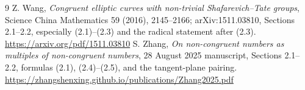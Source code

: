 \documentclass[11pt,a4paper]{article}
\begin{document}
\begin{thebibliography}{9}
 Z. Wang, \emph{Congruent elliptic curves with non-trivial Shafarevich--Tate groups}, Science China Mathematics 59 (2016), 2145--2166; arXiv:1511.03810, Sections 2.1--2.2, especially (2.1)--(2.3) and the radical statement after (2.3). \url{https://arxiv.org/pdf/1511.03810}
 S. Zhang, \emph{On non-congruent numbers as multiples of non-congruent numbers}, 28 August 2025 manuscript, Sections 2.1--2.2, formulas (2.1), (2.4)--(2.5), and the tangent-plane pairing. \url{https://zhangshenxing.github.io/publications/Zhang2025.pdf}
\end{thebibliography}
\end{document}
